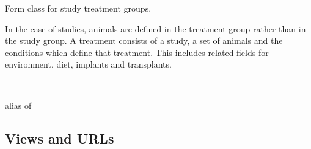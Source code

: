 \documentclass[letterpaper,10pt,english]{sphinxmanual}
\begin{document}
\begin{fulllineitems}
\label{api:data.forms.TreatmentForm}
Form class for study treatment groups.

In the case of studies, animals are defined in the treatment group rather than in the study group.  A treatment consists of a study, a set of animals and the conditions which define that treatment.  This includes related fields for environment, diet, implants and transplants.

\begin{fulllineitems}
\label{api:data.forms.TreatmentForm.Meta}~

\begin{fulllineitems}
\label{api:data.forms.TreatmentForm.Meta.model}
alias of 

\end{fulllineitems}


\end{fulllineitems}


\begin{fulllineitems}
\label{api:data.forms.TreatmentForm.media}
\end{fulllineitems}


\end{fulllineitems}



\subsection{Views and URLs}
\label{api:views-and-urls}\label{api:module-data.views}

\begin{fulllineitems}
\label{api:data.views.add_measurement}
\end{fulllineitems}
\end{document}
